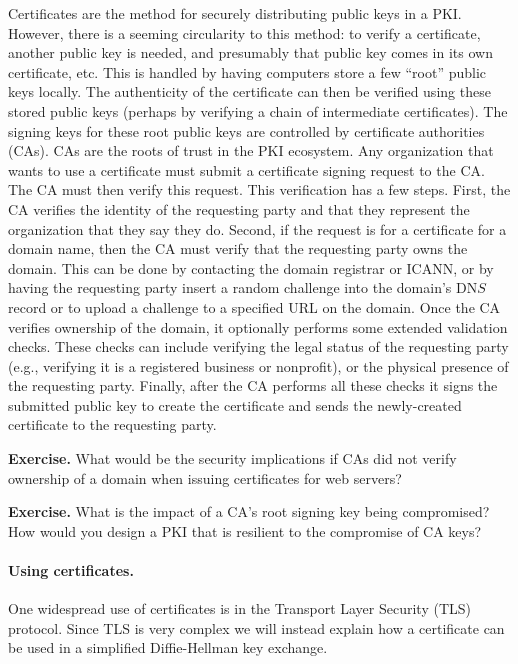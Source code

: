 Certificates are the method for securely distributing public keys in a PKI. However,
there is a seeming circularity to this method: to verify a certificate, another public key is needed,
and presumably that public key comes in its own certificate, etc. This is handled
by having computers store a few ``root'' public keys locally. The authenticity
of the certificate can then be verified using these stored public keys
(perhaps by verifying a chain of intermediate certificates). The
signing keys for these root public keys are controlled by certificate
authorities (CAs). CAs are the roots of trust in the PKI
ecosystem. Any organization that wants to use a certificate must
submit a certificate signing request to the CA.  The CA must then verify
this request. This verification has a few steps. First, the CA verifies
the identity of the requesting party and that they represent the organization
that they say they do. Second, if the request is for a certificate for a domain
name, then the CA must verify that the requesting party owns the domain. This can be
done by contacting the domain registrar or ICANN, or by having the requesting
party insert a random challenge into the domain's DN$S$ record or to upload a challenge to a specified URL on the domain. Once the CA verifies
ownership of the domain, it optionally performs some extended validation checks.
These checks can include verifying the legal status of the requesting party
(e.g., verifying it is a registered business or nonprofit), or the physical
presence of the requesting party. Finally, after the CA performs all these checks
it signs the submitted public key to create the certificate and sends the newly-created
certificate to the requesting party.

\noindent\textbf{Exercise.} What would be the security implications if
CAs did not verify ownership of a domain when issuing certificates for web servers?

\noindent\textbf{Exercise.} What is the impact of a CA's root signing key being
compromised? How would you design a PKI that is resilient to the compromise
of CA keys?

\paragraph{Using certificates.} One widespread use of certificates is
in the Transport Layer Security (TLS) protocol. Since TLS is very complex
we will instead explain how a certificate can be used in a simplified Diffie-Hellman
key exchange.

